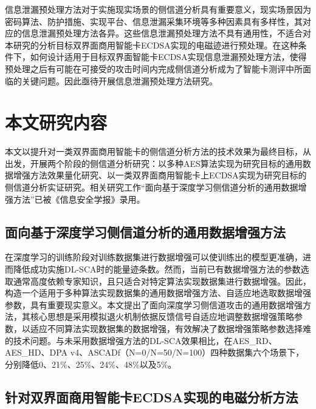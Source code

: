 {	信息泄漏预处理方法对于实施现实场景的侧信道分析具有重要意义，现实场景因为密码算法、防护措施、实现平台、信息泄漏采集环境等多种因素具有多样性，其对应的信息泄漏预处理方法各异。这些信息泄漏预处理方法不具有通用性，不适合对本研究的分析目标双界面商用智能卡ECDSA实现的电磁迹进行预处理。在这种条件下，如何设计适用于目标双界面智能卡ECDSA实现信息泄漏预处理方法，使得预处理之后有可能在可接受的攻击时间内完成侧信道分析成为了智能卡测评中所面临的关键问题。因此亟待开展信息泄漏预处理方法研究。
	\section{本文研究内容}
	本文以提升对一类双界面商用智能卡的侧信道分析方法的技术效果为最终目标，从\jiaodu 出发，开展两个阶段的侧信道分析研究：以多种AES算法实现为研究目标的通用数据增强方法效果量化研究、以一类双界面商用智能卡上ECDSA实现为研究目标的侧信道分析实证研究。\ifshowcontent 相关研究工作“面向基于深度学习侧信道分析的通用数据增强方法”已被《信息安全学报》录用。\fi
	\subsection{面向基于深度学习侧信道分析的通用数据增强方法}
	在深度学习的训练阶段对训练数据集进行数据增强可以使训练出的模型更准确，进而降低成功实施DL-SCA时的能量迹条数。然而，当前已有数据增强方法的参数选取通常高度依赖专家知识，且只适合对特定算法实现数据集进行数据增强。因此，构造一个适用于多种算法实现数据集的通用数据增强方法、自适应地选取数据增强参数，具有重要现实意义。本文提出了面向深度学习侧信道攻击的通用数据增强方法，其核心思想是采用模拟退火机制依据反馈信号自适应地调整数据增强策略参数，以适应不同算法实现数据集的数据增强，有效解决了数据增强策略参数选择难的技术问题。与未采用数据增强方法的DL-SCA效果相比，在AES\_RD、AES\_HD、DPA v4、ASCADf（N=0/N=50/N=100）四种数据集六个场景下，\chenggongtiaoshu 分别降低0、21\%、25\%、24\%、48\%以及5\%。
	\subsection{针对双界面商用智能卡ECDSA实现的电磁分析方法}
	
	{\color{\xchange}
	
}}
